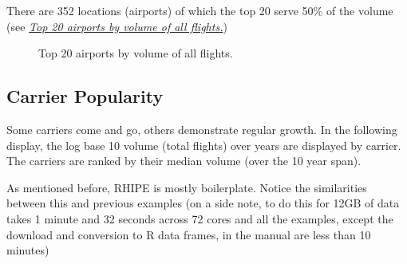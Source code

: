 \documentclass[letterpaper,10pt,english]{sphinxmanual}
\begin{document}
There are 352 locations (airports) of which the top 20 serve 50\% of the volume
(see {\hyperref[airline:figvolume]{\emph{Top 20 airports by volume of all flights.}}})
\begin{figure}[htbp]
\centering
\capstart

\caption{Top 20 airports by volume of all flights.}\label{airline:figvolume}\end{figure}


\subsection{Carrier Popularity}
\label{airline:carrier-popularity}
Some carriers come and go, others demonstrate regular growth. In the following
display, the log base 10 volume (total flights) over years are displayed by
carrier. The carriers are ranked by their median volume (over the 10 year
span).

As mentioned before, RHIPE is mostly boilerplate. Notice the similarities
between this and previous examples (on a side note, to do this for 12GB of data
takes 1 minute and 32 seconds across 72 cores and all the examples, except the
download and conversion to R data frames, in the manual are less than 10 minutes)
\end{document}
